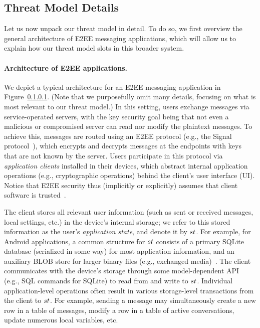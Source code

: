 \subsection{Threat Model Details}
Let us now unpack our threat model in detail. To do so, we first overview the general architecture of E2EE messaging applications, which will allow us to explain how our threat model slots in this broader system.
\paragraph{Architecture of E2EE applications.} We depict a typical architecture for an E2EE messaging application in Figure~\ref{}. (Note that we purposefully omit many details, focusing on what is most relevant to our threat model.) In this setting, users exchange messages via service-operated servers, with the key security goal being that not even a malicious or compromised server can read nor modify the plaintext messages. To achieve this, messages are routed using an E2EE protocol (e.g., the Signal protocol~\cite{signal-docs}), which encrypts and decrypts messages at the endpoints with keys that are not known by the server. Users participate in this protocol via \emph{application clients} installed in their devices, which abstract internal application operations (e.g., cryptographic operations) behind the client's user interface (UI). Notice that E2EE security thus (implicitly or explicitly) assumes that client software is trusted~\cite{fabrega2025mitigating}.

The client stores all relevant user information (such as sent or received messages, local settings, etc.) in the device's internal storage; we refer to this stored information as the user's \emph{application state}, and denote it by $st$. For example, for Android applications, a common structure for $st$ consists of a primary SQLite database (serialized in some way) for most application information, and an auxiliary BLOB store for larger binary files (e.g., exchanged media)~\cite{spahn2014pebbles,fabrega2025mitigating}. The client communicates with the device's storage through some model-dependent API (e.g., SQL commands for SQLite) to read from and write to $st$. Individual application-level operations often result in various storage-level transactions from the client to $st$. For example, sending a message may simultaneously create a new row in a table of messages, modify a row in a table of active conversations, update numerous local variables, etc.

